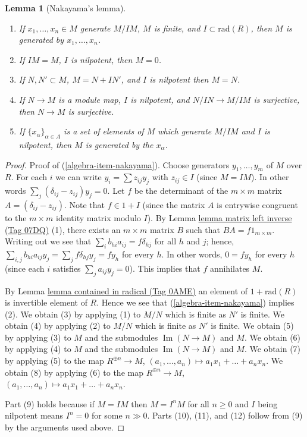 \documentclass{amsart}
\theoremstyle{plain}
\newtheorem{lemma}[subsection]{Lemma}
\theoremstyle{definition}
\theoremstyle{remark}
\numberwithin{equation}{subsection}
\def\Im{\mathop{\mathrm{Im}}}
\begin{document}
\begin{lemma}[Nakayama's lemma]
\begin{enumerate}
then there exists an $f \in 1 + I$ such that $x_1, \ldots, x_n$
generate $M_f$ over $R_f$.
\item If $x_1, \ldots, x_n \in M$ generate $M/IM$, $M$ is finite, and
$I \subset \text{rad}(R)$, then $M$ is generated by $x_1, \ldots, x_n$.
\item If $IM = M$, $I$ is nilpotent, then $M = 0$.
\item If $N, N' \subset M$, $M = N + IN'$, and $I$ is nilpotent then $M = N$.
\item If $N \to M$ is a module map, $I$ is nilpotent, and $N/IN \to M/IM$
is surjective, then $N \to M$ is surjective.
\item If $\{x_\alpha\}_{\alpha \in A}$ is a set of elements of $M$
which generate $M/IM$ and $I$ is nilpotent, then $M$ is generated
by the $x_\alpha$.
\end{enumerate}
\end{lemma}

\begin{proof}
Proof of (\ref{algebra-item-nakayama}). Choose generators $y_1, \ldots, y_m$ of $M$
over $R$. For each $i$ we can write $y_i = \sum z_{ij} y_j$ with
$z_{ij} \in I$ (since $M = IM$).
In other words $\sum_j (\delta_{ij} - z_{ij})y_j = 0$.
Let $f$ be the determinant of the $m \times m$ matrix
$A = (\delta_{ij} - z_{ij})$. Note that $f \in 1 + I$
(since the matrix $A$ is entrywise congruent to the
$m \times m$ identity matrix modulo $I$).
By Lemma \href{https://stacks.math.columbia.edu/tag/07DQ}{lemma matrix left inverse (Tag 07DQ)} (1),
there exists an $m \times m$
matrix $B$ such that $BA = f 1_{m \times m}$. Writing out we see that
$\sum_{i} b_{hi} a_{ij} = f \delta_{hj}$ for all
$h$ and $j$; hence, $\sum_{i, j} b_{hi} a_{ij} y_j
= \sum_{j} f \delta_{hj} y_j = f y_h$ for every $h$.
In other words, $0 = f y_h$ for every $h$ (since each
$i$ satisfies $\sum_j a_{ij} y_j = 0$).
This implies that $f$ annihilates $M$.

\medskip\noindent
By Lemma \href{https://stacks.math.columbia.edu/tag/0AME}{lemma contained in radical (Tag 0AME)} an element of $1 + \text{rad}(R)$ is
invertible element of $R$. Hence we see that (\ref{algebra-item-nakayama}) implies
(2). We obtain (3) by applying (1) to $M/N$ which is finite as $N'$ is finite.
We obtain (4) by applying (2) to $M/N$ which is finite as $N'$ is finite.
We obtain (5) by applying (3) to $M$ and the submodules $\Im(N \to M)$
and $M$. We obtain (6) by applying (4) to $M$ and the submodules
$\Im(N \to M)$ and $M$.
We obtain (7) by applying (5) to the map $R^{\oplus n} \to M$,
$(a_1, \ldots, a_n) \mapsto a_1x_1 + \ldots + a_nx_n$.
We obtain (8) by applying (6) to the map $R^{\oplus n} \to M$,
$(a_1, \ldots, a_n) \mapsto a_1x_1 + \ldots + a_nx_n$.

\medskip\noindent
Part (9) holds because if $M = IM$ then $M = I^nM$ for all $n \geq 0$
and $I$ being nilpotent means $I^n = 0$ for some $n \gg 0$. Parts
(10), (11), and (12) follow from (9) by the arguments used above.
\end{proof}
\end{document}

